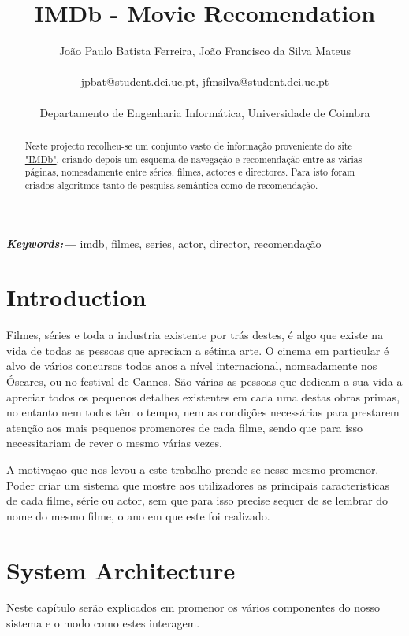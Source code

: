 \documentclass[a4paper]{article}
\providecommand{\keywords}[1]{\textbf{\textit{Keywords:---}} #1}
\begin{document}
\title{\textbf{IMDb - Movie Recomendation}}
\author{João Paulo Batista Ferreira, João Francisco da Silva Mateus\\\\
		jpbat@student.dei.uc.pt, jfmsilva@student.dei.uc.pt\\\\
		Departamento de Engenharia Informática, Universidade de Coimbra}
\maketitle
\begin{abstract}
Neste projecto recolheu-se um conjunto vasto de informação proveniente do site \hyperref[www.imdb.com]{"IMDb"}, criando depois um esquema de navegação e recomendação entre as várias páginas, nomeadamente entre séries, filmes, actores e directores. Para isto foram criados algoritmos tanto de pesquisa semântica como de recomendação.
\end{abstract}
\keywords{imdb, filmes, series, actor, director, recomendação}
\section{Introduction}
\indent \indent Filmes, séries e toda a industria existente por trás destes, é algo que existe na vida de todas as pessoas que apreciam a sétima arte.
O cinema em particular é alvo de vários concursos todos anos a nível internacional, nomeadamente nos Óscares, ou no festival de Cannes. São várias as pessoas que dedicam a sua vida a apreciar todos os pequenos detalhes existentes em cada uma destas obras primas, no entanto nem todos têm o tempo, nem as condições necessárias para prestarem atenção aos mais pequenos promenores de cada filme, sendo que para isso necessitariam de rever o mesmo várias vezes.

A motivaçao que nos levou a este trabalho prende-se nesse mesmo promenor. Poder criar um sistema que mostre aos utilizadores as principais caracteristicas de cada filme, série ou actor, sem que para isso precise sequer de se lembrar do nome do mesmo filme, o ano em que este foi realizado.

\section{System Architecture}
\indent \indent Neste capítulo serão explicados em promenor os vários componentes do nosso sistema e o modo como estes interagem.
\end{document}
